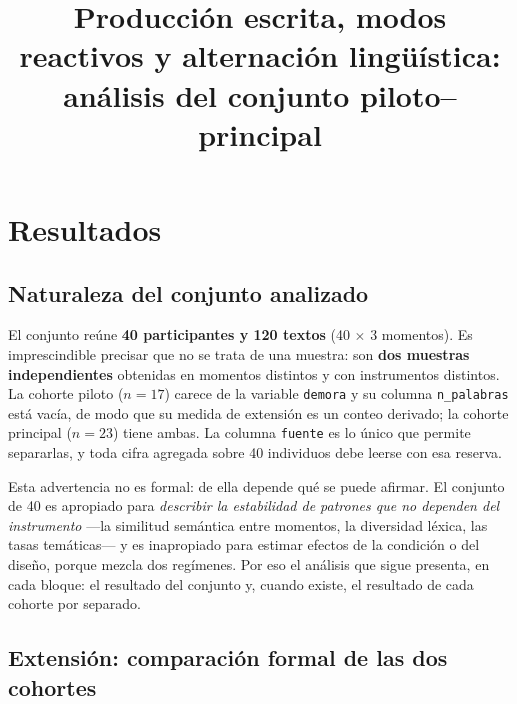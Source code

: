 \documentclass[12pt]{article}
\title{Producción escrita, modos reactivos y alternación lingüística:\\ análisis del conjunto piloto--principal}
\author{}
\date{}
\begin{document}
\maketitle

\section{Resultados}

\subsection{Naturaleza del conjunto analizado}

El conjunto reúne \textbf{40 participantes y 120 textos} (40 $\times$ 3 momentos). Es
imprescindible precisar que no se trata de una muestra: son \textbf{dos muestras
independientes} obtenidas en momentos distintos y con instrumentos distintos. La cohorte piloto
($n = 17$) carece de la variable \texttt{demora} y su columna \texttt{n\_palabras} está vacía,
de modo que su medida de extensión es un conteo derivado; la cohorte principal ($n = 23$) tiene
ambas. La columna \texttt{fuente} es lo único que permite separarlas, y toda cifra agregada
sobre 40 individuos debe leerse con esa reserva.

Esta advertencia no es formal: de ella depende qué se puede afirmar. El conjunto de 40 es
apropiado para \emph{describir la estabilidad de patrones que no dependen del instrumento}
—la similitud semántica entre momentos, la diversidad léxica, las tasas temáticas— y es
inapropiado para estimar efectos de la condición o del diseño, porque mezcla dos regímenes.
Por eso el análisis que sigue presenta, en cada bloque: el resultado del conjunto y, cuando
existe, el resultado de cada cohorte por separado.

\subsection{Extensión: comparación formal de las dos cohortes}
\end{document}
